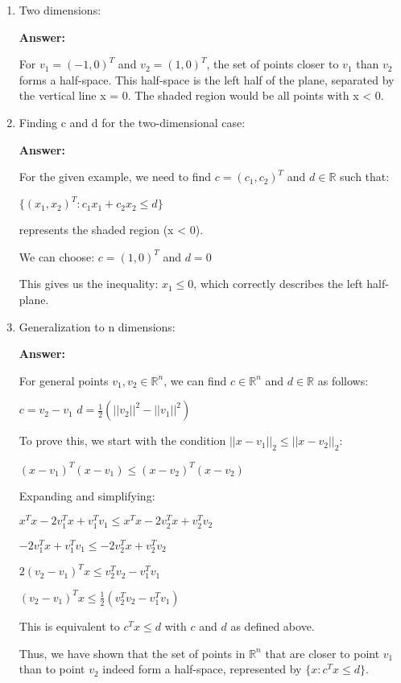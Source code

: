 \documentclass{article}
\newenvironment{answer}
    {\par\noindent\textbf{Answer:}\par}
    {\par}
\begin{document}
\begin{enumerate}
    \item Two dimensions:
    \begin{answer}
    For $v_1 = (-1, 0)^T$ and $v_2 = (1, 0)^T$, the set of points closer to $v_1$ than $v_2$ forms a half-space. This half-space is the left half of the plane, separated by the vertical line x = 0. The shaded region would be all points with x < 0.
    \end{answer}

    \item Finding c and d for the two-dimensional case:
    \begin{answer}
    For the given example, we need to find $c = (c_1, c_2)^T$ and $d \in \mathbb{R}$ such that:
    
    $\{(x_1, x_2)^T : c_1x_1 + c_2x_2 \leq d\}$
    
    represents the shaded region (x < 0).
    
    We can choose:
    $c = (1, 0)^T$ and $d = 0$
    
    This gives us the inequality: $x_1 \leq 0$, which correctly describes the left half-plane.
    \end{answer}

    \item Generalization to n dimensions:
    \begin{answer}
    For general points $v_1, v_2 \in \mathbb{R}^n$, we can find $c \in \mathbb{R}^n$ and $d \in \mathbb{R}$ as follows:
    
    $c = v_2 - v_1$
    $d = \frac{1}{2}(||v_2||^2 - ||v_1||^2)$
    
    To prove this, we start with the condition $||x - v_1||_2 \leq ||x - v_2||_2$:
    
    $(x - v_1)^T(x - v_1) \leq (x - v_2)^T(x - v_2)$
    
    Expanding and simplifying:
    
    $x^Tx - 2v_1^Tx + v_1^Tv_1 \leq x^Tx - 2v_2^Tx + v_2^Tv_2$
    
    $-2v_1^Tx + v_1^Tv_1 \leq -2v_2^Tx + v_2^Tv_2$
    
    $2(v_2 - v_1)^Tx \leq v_2^Tv_2 - v_1^Tv_1$
    
    $(v_2 - v_1)^Tx \leq \frac{1}{2}(v_2^Tv_2 - v_1^Tv_1)$
    
    This is equivalent to $c^Tx \leq d$ with $c$ and $d$ as defined above.
    
    Thus, we have shown that the set of points in $\mathbb{R}^n$ that are closer to point $v_1$ than to point $v_2$ indeed form a half-space, represented by $\{x : c^Tx \leq d\}$.
    \end{answer}
\end{enumerate}
\end{document}
